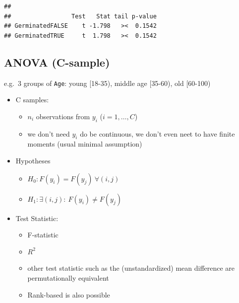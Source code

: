 \documentclass[
]{article}
\providecommand{\tightlist}{%
  \setlength{\itemsep}{0pt}\setlength{\parskip}{0pt}}
\begin{document}
\begin{verbatim}
## 
##                 Test   Stat tail p-value
## GerminatedFALSE    t -1.798   ><  0.1542
## GerminatedTRUE     t  1.798   ><  0.1542
\end{verbatim}

\hypertarget{anova-c-sample}{%
\subsection{ANOVA (C-sample)}\label{anova-c-sample}}

e.g.~3 groups of \texttt{Age}: young {[}18-35), middle age {[}35-60),
old {[}60-100)

\begin{itemize}
\tightlist
\item
  C samples:

  \begin{itemize}
  \tightlist
  \item
    \(n_i\) observations from \(y_i\) (\(i=1,\ldots,C\))
  \item
    we don't need \(y_i\) do be continuous, we don't even neet to have
    finite moments (usual minimal assumption)
  \end{itemize}
\item
  Hypotheses

  \begin{itemize}
  \tightlist
  \item
    \(H_0: F(y_i)=F(y_j)\ \forall (i,j)\)\\
  \item
    \(H_1: \exists (i,j): \ F(y_i)\neq F(y_j)\)
  \end{itemize}
\end{itemize}

\begin{itemize}
\tightlist
\item
  Test Statistic:

  \begin{itemize}
  \tightlist
  \item
    F-statistic\\
  \item
    \(R^2\)\\
  \item
    other test statistic such as the (unstandardized) mean difference
    are permutationally equivalent
  \item
    Rank-based is also possible
  \end{itemize}
\end{itemize}
\end{document}

